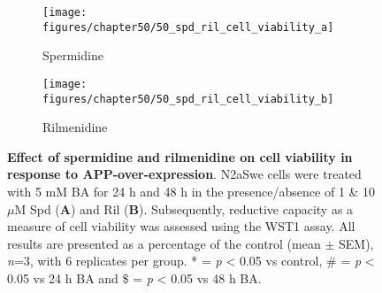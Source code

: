 \begin{figure}[!htbp]
  \centering
  \begin{subfigure}[b]{0.495\linewidth}
    \texttt{[image: figures/chapter50/50\_spd\_ril\_cell\_viability\_a]}
    \caption{Spermidine}
  \end{subfigure}
  \begin{subfigure}[b]{0.495\linewidth}
    \texttt{[image: figures/chapter50/50\_spd\_ril\_cell\_viability\_b]}
    \caption{Rilmenidine}
  \end{subfigure}
  \caption[Effect of spermidine and rilmenidine on cell viability in response to APP-over-expression]{\textbf{Effect of spermidine and rilmenidine on cell viability in response to APP-over-expression}. N2aSwe cells were treated with 5 mM BA for 24 h and 48 h in the presence/absence of 1 \& 10 $\mu$M Spd (\textbf{A}) and Ril (\textbf{B}). Subsequently, reductive capacity as a measure of cell viability was assessed using the WST1 assay. All results are presented as a percentage of the control (mean $\pm$ SEM), \textit{n}=3, with 6 replicates per group. * = \textit{p} < 0.05 vs control, \# = \textit{p} < 0.05 vs 24 h BA and \$ = \textit{p} < 0.05 vs 48 h BA.}
  \label{fig:50_spd_ril_cell_viability_a}
\end{figure}

